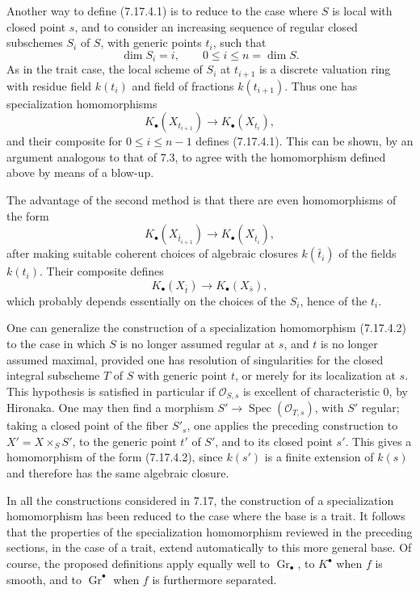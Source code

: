 \documentclass[11pt]{article}
\newcommand{\Gr}{\operatorname{Gr}}
\newcommand{\Spec}{\operatorname{Spec}}
\providecommand{\Gr}{\operatorname{Gr}}
\providecommand{\Gr}{\operatorname{G}}
\begin{document}
Another way to define (7.17.4.1) is to reduce to the case where \(S\) is local with closed point \(s\), and to consider an increasing sequence of regular closed subschemes \(S_i\) of \(S\), with generic points \(t_i\), such that
\[
  \dim S_i=i,\qquad 0\leq i\leq n=\dim S.
\]
As in the trait case, the local scheme of \(S_i\) at \(t_{i+1}\) is a discrete valuation ring with residue field \(k(t_i)\) and field of fractions \(k(t_{i+1})\). Thus one has specialization homomorphisms
\[
  K_\bullet(X_{t_{i+1}})\longrightarrow K_\bullet(X_{t_i}),
\]
and their composite for \(0\leq i\leq n-1\) defines (7.17.4.1). This can be shown, by an argument analogous to that of 7.3, to agree with the homomorphism defined above by means of a blow-up.

The advantage of the second method is that there are even homomorphisms of the form
\[
  K_\bullet(X_{\bar t_{i+1}})\longrightarrow K_\bullet(X_{\bar t_i}),
\]
after making suitable coherent choices of algebraic closures \(k(\bar t_i)\) of the fields \(k(t_i)\). Their composite defines
\begin{equation}\tag{7.17.4.2}
  K_\bullet(X_{\bar t})\longrightarrow K_\bullet(X_{\bar s}),
\end{equation}
which probably depends essentially on the choices of the \(S_i\), hence of the \(t_i\).

One can generalize the construction of a specialization homomorphism (7.17.4.2) to the case in which \(S\) is no longer assumed regular at \(s\), and \(t\) is no longer assumed maximal, provided one has resolution of singularities for the closed integral subscheme \(T\) of \(S\) with generic point \(t\), or merely for its localization at \(s\). This hypothesis is satisfied in particular if \(\mathcal O_{S,s}\) is excellent of characteristic \(0\), by Hironaka. One may then find a morphism \(S'\to \Spec(\mathcal O_{T,s})\), with \(S'\) regular; taking a closed point of the fiber \(S'_s\), one applies the preceding construction to \(X'=X\times_SS'\), to the generic point \(t'\) of \(S'\), and to its closed point \(s'\). This gives a homomorphism of the form (7.17.4.2), since \(k(s')\) is a finite extension of \(k(s)\) and therefore has the same algebraic closure.

In all the constructions considered in 7.17, the construction of a specialization homomorphism has been reduced to the case where the base is a trait. It follows that the properties of the specialization homomorphism reviewed in the preceding sections, in the case of a trait, extend automatically to this more general base. Of course, the proposed definitions apply equally well to \(\Gr_\bullet\), to \(K^\bullet\) when \(f\) is smooth, and to \(\Gr^\bullet\) when \(f\) is furthermore separated.
\end{document}
